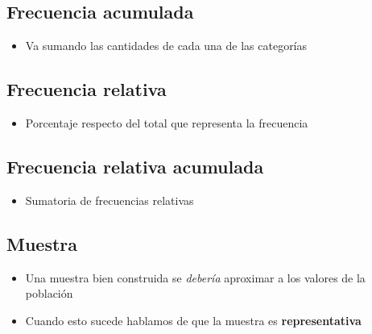 \subsection{Frecuencia acumulada}
\begin{itemize}
    \item Va sumando las cantidades de cada una de las categorías
\end{itemize}

\subsection{Frecuencia relativa}
\begin{itemize}
    \item Porcentaje respecto del total que representa la frecuencia
\end{itemize}

\subsection{Frecuencia relativa acumulada}
\begin{itemize}
    \item Sumatoria de frecuencias relativas
\end{itemize}

\subsection{Muestra}
\begin{itemize}
    \item Una muestra bien construida se \textit{debería} aproximar a los valores 
    de la población 
    \item Cuando esto sucede hablamos de que la muestra es \textbf{representativa}
\end{itemize}
